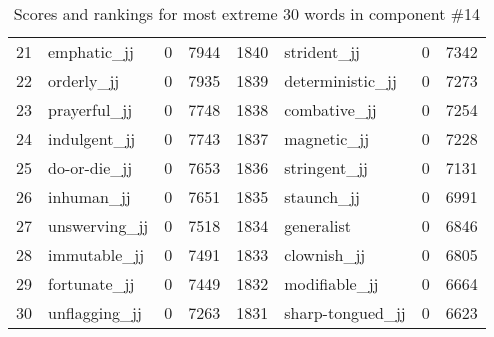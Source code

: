 \begin{table}[tbp]
\begin{tabular}{| rlr@{.}l | rlr@{.}l |}
    21 & emphatic\_jj & 0 & 7944    &    1840 & strident\_jj & 0 & 7342 \\
    22 & orderly\_jj & 0 & 7935    &    1839 & deterministic\_jj & 0 & 7273 \\
    23 & prayerful\_jj & 0 & 7748    &    1838 & combative\_jj & 0 & 7254 \\
    24 & indulgent\_jj & 0 & 7743    &    1837 & magnetic\_jj & 0 & 7228 \\
    25 & do-or-die\_jj & 0 & 7653    &    1836 & stringent\_jj & 0 & 7131 \\
    26 & inhuman\_jj & 0 & 7651    &    1835 & staunch\_jj & 0 & 6991 \\
    27 & unswerving\_jj & 0 & 7518    &    1834 & generalist & 0 & 6846 \\
    28 & immutable\_jj & 0 & 7491    &    1833 & clownish\_jj & 0 & 6805 \\
    29 & fortunate\_jj & 0 & 7449    &    1832 & modifiable\_jj & 0 & 6664 \\
    30 & unflagging\_jj & 0 & 7263    &    1831 & sharp-tongued\_jj & 0 & 6623 \\
    \hline
    \end{tabular}
    \caption{Scores and rankings for most extreme 30 words in component \#14} 
\end{table}
\clearpage
